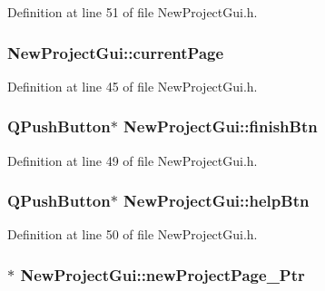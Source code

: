 Definition at line 51 of file New\-Project\-Gui.\-h.

\hypertarget{class_new_project_gui_ac1b0414d92030b3d545020fc889b1313}{
\subsubsection[{current\-Page}]{ New\-Project\-Gui\-::current\-Page\hspace{0.3cm}{\ttfamily [private]}}}\label{class_new_project_gui_ac1b0414d92030b3d545020fc889b1313}


Definition at line 45 of file New\-Project\-Gui.\-h.

\hypertarget{class_new_project_gui_ab5d0c64c04e2c9c1ff6e57191e35f79f}{
\subsubsection[{finish\-Btn}]{\setlength{\rightskip}{0pt plus 5cm}Q\-Push\-Button$\ast$ New\-Project\-Gui\-::finish\-Btn\hspace{0.3cm}{\ttfamily [private]}}}\label{class_new_project_gui_ab5d0c64c04e2c9c1ff6e57191e35f79f}


Definition at line 49 of file New\-Project\-Gui.\-h.

\hypertarget{class_new_project_gui_a33ab8b2813bd5f5ae52c7d91c996f61f}{
\subsubsection[{help\-Btn}]{\setlength{\rightskip}{0pt plus 5cm}Q\-Push\-Button$\ast$ New\-Project\-Gui\-::help\-Btn\hspace{0.3cm}{\ttfamily [private]}}}\label{class_new_project_gui_a33ab8b2813bd5f5ae52c7d91c996f61f}


Definition at line 50 of file New\-Project\-Gui.\-h.

\hypertarget{class_new_project_gui_a21cb8b6c6a0b743e7bdc2e4e4ff7e839}{
\subsubsection[{new\-Project\-Page\-\_\-1\-Ptr}]{$\ast$ New\-Project\-Gui\-::new\-Project\-Page\-\_\-Ptr\hspace{0.3cm}{\ttfamily [private]}}}\label{class_new_project_gui_a21cb8b6c6a0b743e7bdc2e4e4ff7e839}


